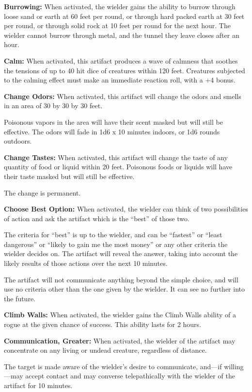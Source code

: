 \begin{multicols*}{2}
\textbf{Burrowing:} When activated, the wielder gains the ability to burrow through loose sand or earth at 60 feet per round, or through hard packed earth at 30 feet per round, or through solid rock at 10 feet per round for the next hour. The wielder cannot burrow through metal, and the tunnel they leave closes after an hour.

\textbf{Calm:} When activated, this artifact produces a wave of calmness that soothes the tensions of up to 40 hit dice of creatures within 120 feet. Creatures subjected to the calming effect must make an immediate reaction roll, with a +4 bonus.

\textbf{Change Odors:} When activated, this artifact will change the odors and smells in an area of 30 by 30 by 30 feet.

Poisonous vapors in the area will have their scent masked but will still be effective. The odors will fade in 1d6 x 10 minutes indoors, or 1d6 rounds outdoors.

\textbf{Change Tastes:} When activated, this artifact will change the taste of any quantity of food or liquid within 20 feet. Poisonous foods or liquids will have their taste masked but will still be effective.

The change is permanent.

\textbf{Choose Best Option:} When activated, the wielder can think of two possibilities of action and ask the artifact which is the “best” of those two.

The criteria for “best” is up to the wielder, and can be “fastest” or “least dangerous” or “likely to gain me the most money” or any other criteria the wielder decides on. The artifact will reveal the answer, taking into account the likely results of those actions over the next 10 minutes.

The artifact will not communicate anything beyond the simple choice, and will use no criteria other than the one given by the wielder. It can see no further into the future.

\textbf{Climb Walls:} When activated, the wielder gains the Climb Walls ability of a rogue at the given chance of success. This ability lasts for 2 hours.

\textbf{Communication, Greater:} When activated, the wielder of the artifact may concentrate on any living or undead creature, regardless of distance.

The target is made aware of the wielder’s desire to communicate, and—if willing—may accept contact and may converse telepathically with the wielder of the artifact for 10 minutes.


\end{multicols*}
